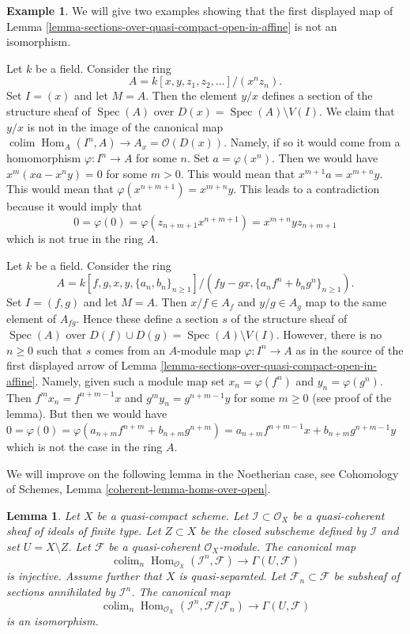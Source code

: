 \documentclass{stacks-project}
\theoremstyle{plain}
\newtheorem{lemma}[subsection]{Lemma}
\theoremstyle{definition}
\newtheorem{example}[subsection]{Example}
\theoremstyle{remark}
\numberwithin{equation}{subsection}
\def\colim{\mathop{\mathrm{colim}}\nolimits}
\def\Spec{\mathop{\mathrm{Spec}}}
\def\Hom{\mathop{\mathrm{Hom}}\nolimits}
\begin{document}
\begin{example}
\label{example-does-not-work-in-general}
We will give two examples showing that the first displayed map of
Lemma \ref{lemma-sections-over-quasi-compact-open-in-affine}
is not an isomorphism.

\medskip\noindent
Let $k$ be a field. Consider the ring
$$
A = k[x, y, z_1, z_2, \ldots]/(x^nz_n).
$$
Set $I = (x)$ and let $M = A$. Then the element $y/x$ defines a section of
the structure sheaf of $\Spec(A)$ over $D(x) = \Spec(A) \setminus V(I)$.
We claim that $y/x$ is not in the image of the canonical map
$\colim \Hom_A(I^n, A) \to A_x = \mathcal{O}(D(x))$. Namely, if so it
would come from a homomorphism $\varphi : I^n \to A$ for some $n$.
Set $a = \varphi(x^n)$. Then we would have $x^m(xa - x^ny) = 0$ for some
$m > 0$. This would mean that $x^{m + 1}a = x^{m + n}y$. This would mean that
$\varphi(x^{n + m + 1}) = x^{m + n}y$. This leads to a contradiction
because it would imply that
$$
0 = \varphi(0) = \varphi(z_{n + m + 1} x^{n + m + 1}) =
x^{m + n}y z_{n + m + 1}
$$
which is not true in the ring $A$.

\medskip\noindent
Let $k$ be a field. Consider the ring
$$
A = k[f, g, x, y, \{a_n, b_n\}_{n \geq 1}]/
(fy - gx, \{a_nf^n + b_ng^n\}_{n \geq 1}).
$$
Set $I = (f, g)$ and let $M = A$. Then $x/f \in A_f$ and $y/g \in A_g$
map to the same element of $A_{fg}$. Hence these define a section $s$
of the structure sheaf of $\Spec(A)$ over
$D(f) \cup D(g) = \Spec(A) \setminus V(I)$. However, there is no
$n \geq 0$ such that $s$ comes from an $A$-module map
$\varphi : I^n \to A$ as in the source of the first displayed arrow
of Lemma \ref{lemma-sections-over-quasi-compact-open-in-affine}.
Namely, given such a module map set
$x_n = \varphi(f^n)$ and $y_n = \varphi(g^n)$.
Then $f^mx_n = f^{n + m - 1}x$ and
$g^my_n = g^{n + m - 1}y$ for some $m \geq 0$ (see proof
of the lemma). But then we would have
$0 = \varphi(0) =
\varphi(a_{n + m}f^{n + m} + b_{n + m}g^{n + m}) =
a_{n + m}f^{n + m - 1}x + b_{n + m}g^{n + m - 1}y$ which is not the case
in the ring $A$.
\end{example}

\noindent
We will improve on the following lemma in the Noetherian case, see
Cohomology of Schemes, Lemma \ref{coherent-lemma-homs-over-open}.

\begin{lemma}
\label{lemma-sections-over-quasi-compact-open}
Let $X$ be a quasi-compact scheme.
Let $\mathcal{I} \subset \mathcal{O}_X$ be a
quasi-coherent sheaf of ideals of finite type.
Let $Z \subset X$ be the closed subscheme
defined by $\mathcal{I}$ and set $U = X \setminus Z$.
Let $\mathcal{F}$ be a quasi-coherent $\mathcal{O}_X$-module.
The canonical map
$$
\colim_n \Hom_{\mathcal{O}_X}(\mathcal{I}^n,
\mathcal{F})
\longrightarrow
\Gamma(U, \mathcal{F})
$$
is injective. Assume further that $X$ is quasi-separated.
Let $\mathcal{F}_n \subset \mathcal{F}$
be subsheaf of sections annihilated by $\mathcal{I}^n$.
The canonical map
$$
\colim_n \Hom_{\mathcal{O}_X}(\mathcal{I}^n,
\mathcal{F}/\mathcal{F}_n)
\longrightarrow
\Gamma(U, \mathcal{F})
$$
is an isomorphism.
\end{lemma}
\end{document}
